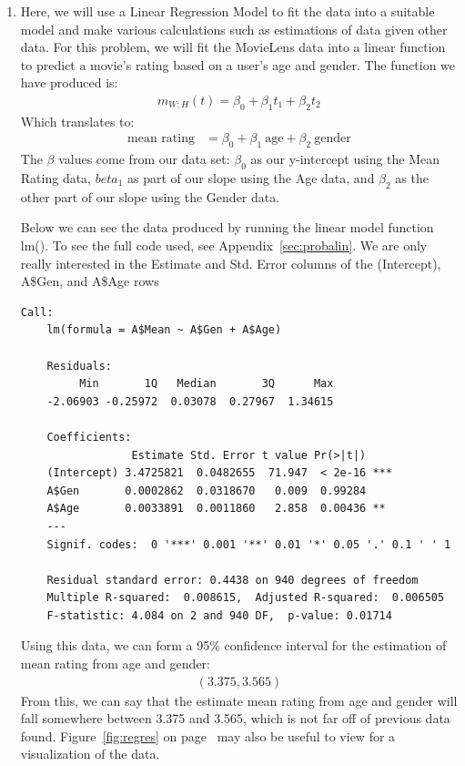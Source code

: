 \documentclass[11pt]{article}  %
\begin{document}
\begin{enumerate}
    \item Here, we will use a Linear Regression Model to fit the data into a suitable model and make various calculations such as estimations of data given other data. For this problem, we will fit the MovieLens data into a linear function to predict a movie's rating based on a user's age and gender. The function we have produced is:
    \begin{align*}
        m_{W;H}(t) = \beta_0 + \beta_1 t_1 + \beta_2 t_2
    \end{align*}
    Which translates to:
    \begin{align*}
        \text{mean rating} &= \beta_0 + \beta_1\ \text{age} + \beta_2\ \text{gender}
    \end{align*}
    The $\beta$ values come from our data set: $\beta_0$ as our y-intercept using the Mean Rating data, $beta_1$ as part of our slope using the Age data, and $\beta_2$ as the other part of our slope using the Gender data.
    
    Below we can see the data produced by running the linear model function lm(). To see the full code used, see Appendix~\ref{sec:probalin}. We are only really interested in the Estimate and Std. Error columns of the (Intercept), A\$Gen, and A\$Age rows
    \begin{lstlisting}[basicstyle=\small]
    Call:
    lm(formula = A$Mean ~ A$Gen + A$Age)
    
    Residuals:
         Min       1Q   Median       3Q      Max 
    -2.06903 -0.25972  0.03078  0.27967  1.34615 
    
    Coefficients:
                 Estimate Std. Error t value Pr(>|t|)    
    (Intercept) 3.4725821  0.0482655  71.947  < 2e-16 ***
    A$Gen       0.0002862  0.0318670   0.009  0.99284    
    A$Age       0.0033891  0.0011860   2.858  0.00436 ** 
    ---
    Signif. codes:  0 '***' 0.001 '**' 0.01 '*' 0.05 '.' 0.1 ' ' 1

    Residual standard error: 0.4438 on 940 degrees of freedom
    Multiple R-squared:  0.008615,	Adjusted R-squared:  0.006505 
    F-statistic: 4.084 on 2 and 940 DF,  p-value: 0.01714
    \end{lstlisting}
    Using this data, we can form a 95\% confidence interval for the estimation of mean rating from age and gender:
    \begin{align*}
        (3.375, 3.565)
    \end{align*}
    From this, we can say that the estimate mean rating from age and gender will fall somewhere between 3.375 and 3.565, which is not far off of previous data found. Figure~\ref{fig:regres} on page~\pageref{fig:regres} may also be useful to view for a visualization of the data.
    

\end{enumerate}
\end{document}
